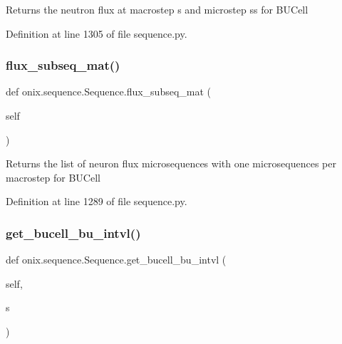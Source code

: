 \begin{DoxyVerb}Returns the neutron flux at macrostep s and microstep ss for BUCell\end{DoxyVerb}
 

Definition at line 1305 of file sequence.\+py.

\mbox{\label{classonix_1_1sequence_1_1Sequence_a7bdc99d34fa79fec10d979a972138ffa}} 
\subsubsection{\texorpdfstring{flux\+\_\+subseq\+\_\+mat()}{flux\_subseq\_mat()}}
{\footnotesize\ttfamily def onix.\+sequence.\+Sequence.\+flux\+\_\+subseq\+\_\+mat (\begin{DoxyParamCaption}\item[{}]{self }\end{DoxyParamCaption})}

\begin{DoxyVerb}Returns the list of neuron flux microsequences with one microsequences per macrostep
for BUCell\end{DoxyVerb}
 

Definition at line 1289 of file sequence.\+py.

\mbox{\label{classonix_1_1sequence_1_1Sequence_a63956192d96130aa044ae707fbb03b40}} 
\subsubsection{\texorpdfstring{get\+\_\+bucell\+\_\+bu\+\_\+intvl()}{get\_bucell\_bu\_intvl()}}
{\footnotesize\ttfamily def onix.\+sequence.\+Sequence.\+get\+\_\+bucell\+\_\+bu\+\_\+intvl (\begin{DoxyParamCaption}\item[{}]{self,  }\item[{}]{s }\end{DoxyParamCaption})}

